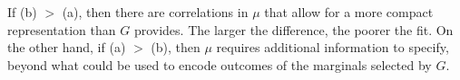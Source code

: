 \documentclass[letterpaper]{article} %
\theoremstyle{plain}
\theoremstyle{definition}
\theoremstyle{remark}
\begin{document}
If (b) $>$ (a), then there are correlations in $\mu$ that allow for a more
compact representation than $G$ provides.
The larger the difference, the poorer the fit.
On the other hand, if (a) $>$ (b), then
$\mu$ requires additional information to specify, beyond
what could be used to encode outcomes of the marginals selected by $G$.
\end{document}
